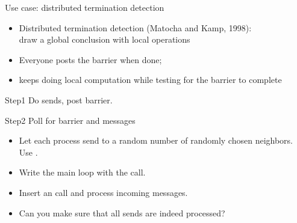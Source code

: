 \begin{numberedframe}{Use case: distributed termination detection}
  \begin{itemize}
  \item Distributed termination detection (Matocha and Kamp, 1998):\\
    draw a global conclusion with local operations
  \item Everyone posts the barrier when done;
  \item keeps doing local computation while testing for the barrier to
    complete
  \end{itemize}
\end{numberedframe}


\begin{numberedframe}{Step1}
  Do sends, post barrier.
\end{numberedframe}

\begin{numberedframe}{Step2}
  Poll for barrier and messages
\end{numberedframe}

\begin{exerciseframe}[ibarrierupdate]
  \begin{itemize}
  \item Let each process send to a random number of randomly chosen
    neighbors. Use .
  \item Write the main loop with the  call.
  \item Insert an  call and process incoming messages.
  \item Can you make sure that all sends are indeed processed?
  \end{itemize}
\end{exerciseframe}

\begin{comment}
  \begin{numberedframe}{Problem with `progress'}
    \begin{itemize}
    \item Problem: \indexmpishow{MPI_Test} is local
    \item Something needs to force the barrier information to propagate
    \item Solution: force progress with \indexmpishow{MPI_Iprobe}
    \item Frowny face: barrier completion takes much longer than you'd expect.
    \end{itemize}
  \end{numberedframe}
\end{comment}

\endinput

\begin{numberedframe}{}
\begin{lstlisting}
  
\end{lstlisting}
\end{numberedframe}

